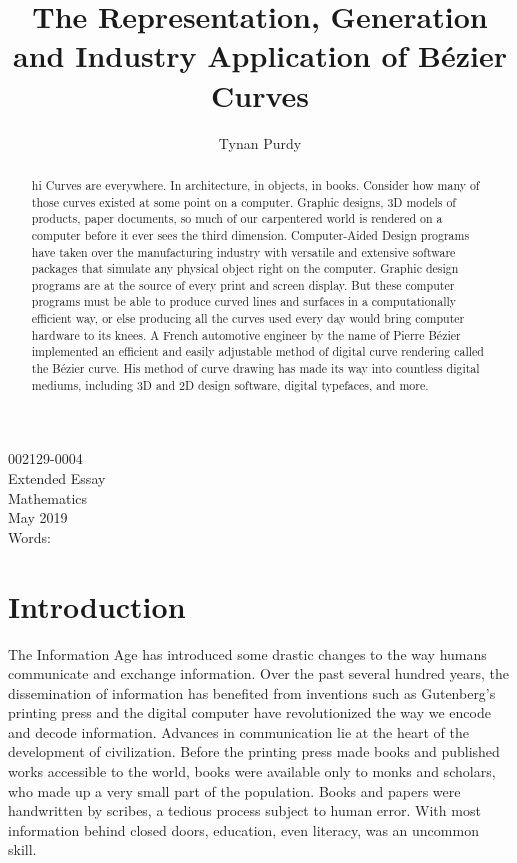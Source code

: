 \documentclass[12pt,letterpaper]{article}
\title{The Representation, Generation and Industry Application of B\'ezier Curves}
\author{Tynan Purdy}
\date{\vspace{-5ex}}
\begin{document}
\large
\parindent=0.5in
{\fontsize{12}{14.4}
	{\singlespace
	\maketitle
	\begin{center}
	\vspace{4mm}
	002129-0004 \\
	\vspace{4mm}
	Extended Essay \\
	\vspace{4mm}
	Mathematics \\
	\vspace{4mm}
	May 2019 \\
	\vspace{4mm}
	Words: \\
	\end{center}
	}
}	

\newpage
{}
\begin{abstract}
hi Curves are everywhere. In architecture, in objects, in books. Consider how many of those curves existed at some point on a computer. Graphic designs, 3D models of products, paper documents, so much of our carpentered world is rendered on a computer before it ever sees the third dimension. Computer-Aided Design programs have taken over the manufacturing industry with versatile and extensive software packages that simulate any physical object right on the computer. Graphic design programs are at the source of every print and screen display. But these computer programs must be able to produce curved lines and surfaces in a computationally efficient way, or else producing all the curves used every day would bring computer hardware to its knees. A French automotive engineer by the name of Pierre B\'ezier implemented an efficient and easily adjustable method of digital curve rendering called the B\'ezier curve. His method of curve drawing has made its way into countless digital mediums, including 3D and 2D design software, digital typefaces, and more.
\end{abstract}

\newpage
\tableofcontents

\newpage
\section{Introduction}
The Information Age has introduced some drastic changes to the way humans communicate and exchange information. Over the past several hundred years, the dissemination of information has benefited from inventions such as Gutenberg’s printing press and the digital computer have revolutionized the way we encode and decode information. Advances in communication lie at the heart of the development of civilization. Before the printing press made books and published works accessible to the world, books were available only to monks and scholars, who made up a very small part of the population. Books and papers were handwritten by scribes, a tedious process subject to human error. With most information behind closed doors, education, even literacy, was an uncommon skill. 
\end{document}
